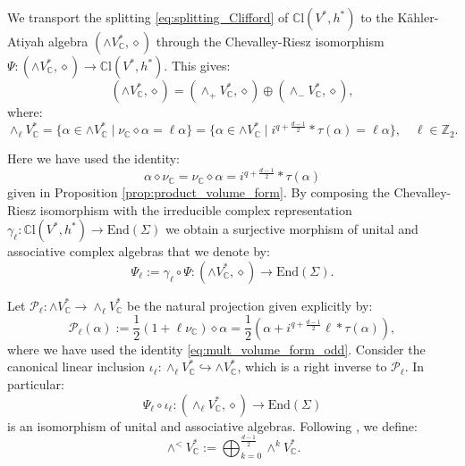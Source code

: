 \documentclass[10pt,a4paper,twoside,reqno]{amsart}
\theoremstyle{plain}
\theoremstyle{definition}
\theoremstyle{remark}
\newcommand{\End}{\mathrm{End}}
\def\C{\mathbb{C}}
\def\cP{\mathcal{P}}
\def\cP{\mathcal{P}}
\def\mCl{\mathbb{C}\mathrm{l}}
\begin{document}
We transport the splitting \eqref{eq:splitting_Clifford} of $\mCl(V^*,h^*)$ to the Kähler-Atiyah algebra $(\wedge V^*_\C,\diamond)$ through the Chevalley-Riesz isomorphism $\Psi\colon(\wedge V^*_\C,\diamond)\to\mCl(V^*,h^*)$. This gives: $$(\wedge V^*_\C,\diamond)=(\wedge_+V^*_\C,\diamond)\oplus(\wedge_- V^*_\C,\diamond),$$ where: $$\wedge_\ell V^*_\C=\{\alpha\in\wedge V^*_\C\mid\nu_\C\diamond\alpha=\ell\alpha\}=\{\alpha\in\wedge V^*_\C\mid i^{q+\frac{d-1}{2}}*\tau(\alpha)=\ell\alpha\},\quad\ell\in\mathbb{Z}_2.$$

Here we have used the identity: 
\begin{equation}\label{eq:mult_volume_form_odd}
    \alpha\diamond\nu_\C=\nu_\C\diamond\alpha=i^{q+\frac{d-1}{2}}*\tau(\alpha)
\end{equation} 
given in Proposition \ref{prop:product_volume_form}. By composing the Chevalley-Riesz isomorphism with the irreducible complex representation $\gamma_\ell\colon\mCl(V^*,h^*)\to\End(\Sigma)$ we obtain a surjective morphism of unital and associative complex algebras that we denote by: $$\Psi_\ell:=\gamma_\ell\circ\Psi\colon(\wedge V^*_\C,\diamond)\to\End(\Sigma).$$

Let $\cP_\ell\colon\wedge V^*_\C\to\wedge_\ell V^*_\C$ be the natural projection given explicitly by: \begin{equation}\label{eq:projection_l}
    \cP_\ell(\alpha):=\frac{1}{2}(1+\ell\nu_\C)\diamond\alpha=\frac{1}{2}(\alpha+i^{q+\frac{d-1}{2}}\ell*\tau(\alpha)),
\end{equation} where we have used the identity \eqref{eq:mult_volume_form_odd}. Consider the canonical linear inclusion $\iota_\ell\colon\wedge_\ell V_\C^*\hookrightarrow\wedge V_\C^*$, which is a right inverse to $\cP_\ell$. In particular: $$\Psi_\ell\circ\iota_\ell\colon(\wedge_\ell V^*_\C,\diamond)\to\End(\Sigma)$$ is an isomorphism of unital and associative algebras. Following \cite{LBC13,LB13,LBC16}, we define: \begin{equation*}\label{eq:vee_product}
    \wedge^<V^*_\C:=\bigoplus_{k=0}^{\frac{d-1}{2}}\wedge^kV^*_\C.
\end{equation*}
\end{document}
